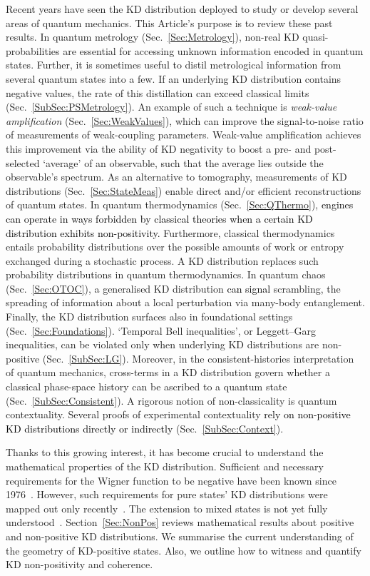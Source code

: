 \documentclass[%
 reprint,
superscriptaddress,
nofootinbib,
bibnotes,
 amsmath,amssymb,
 aps,
]{revtex4-1}
\theoremstyle{plain}
\newcommand{\Dave}[1]{\textcolor{black}{#1} }
\newcommand{\nicole}[1]{\textcolor{black}{#1} }
\begin{document}
Recent years have seen the KD distribution deployed to study or develop several areas of quantum mechanics.  This Article's purpose is to review these past results.   In quantum metrology (Sec.~\ref{Sec:Metrology}), non-real KD quasi-probabilities are essential for accessing unknown information encoded in quantum states.    Further, it is sometimes useful to distil metrological information from several quantum states into a few.  If an underlying KD distribution contains negative values, the rate of this distillation can exceed classical limits (Sec.~\ref{SubSec:PSMetrology}).  An example of such a technique is \textit{weak-value amplification} (Sec.~\ref{Sec:WeakValues}),  which can improve the signal-to-noise ratio of measurements of weak-coupling parameters.  Weak-value amplification achieves this improvement via the ability of KD negativity to boost  a pre- and post-selected `average' of an observable, such that the average lies outside the observable's spectrum.    As an alternative to tomography,  measurements of KD distributions (Sec.~\ref{Sec:StateMeas}) enable direct and/or efficient reconstructions of quantum states.  In quantum thermodynamics (Sec.~\ref{Sec:QThermo}),   \Dave{engines can operate in ways forbidden by classical theories} 
\nicole{when a certain KD distribution exhibits non-positivity.}
 Furthermore, classical thermodynamics entails probability distributions over the possible amounts of work or entropy exchanged during a stochastic process. A KD distribution replaces such probability distributions in quantum thermodynamics. In quantum chaos (Sec.~\ref{Sec:OTOC}), a generalised KD distribution \Dave{can signal} scrambling, the spreading of information about a local perturbation via many-body entanglement. 
Finally, the KD distribution surfaces also in foundational settings (Sec.~\ref{Sec:Foundations}). `Temporal Bell inequalities', or Leggett--Garg inequalities, 
can be violated only when underlying KD distributions are non-positive (Sec.~\ref{SubSec:LG}). Moreover, in the consistent-histories interpretation of quantum mechanics, cross-terms in a KD distribution  govern whether a classical phase-space history can be ascribed to a quantum state (Sec.~\ref{SubSec:Consistent}). A rigorous notion of non-classicality is quantum contextuality. Several proofs of experimental contextuality 
\nicole{rely on non-positive KD distributions  directly or indirectly}
(Sec.~\ref{SubSec:Context}). 



Thanks to this growing interest, it has become crucial to
understand the mathematical properties of the KD distribution. Sufficient and necessary requirements for the Wigner function to be negative have been known since 1976~\cite{Hudson74}. However, such requirements for pure states' KD distributions were mapped out only recently~\cite{ArvidssonShukur2021,DeBievre2021, debievre2023}. The extension to mixed states is not yet fully understood~\cite{langrenez2023characterizing,ADBLSLT24}.  Section~\ref{Sec:NonPos} reviews mathematical results about positive and non-positive KD distributions. We summarise the current understanding of the geometry of KD-positive states. Also, we outline how to witness and quantify KD non-positivity and coherence.
\end{document}
